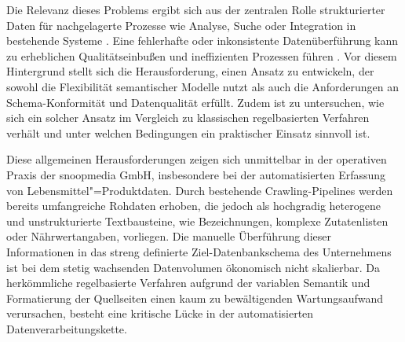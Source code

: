 Die Relevanz dieses Problems ergibt sich aus der zentralen Rolle strukturierter Daten für nachgelagerte Prozesse wie Analyse, Suche oder Integration in bestehende Systeme
 \parencite[vgl.][S. 3]{doan2012principles}. Eine fehlerhafte oder inkonsistente Datenüberführung kann zu erheblichen Qualitätseinbußen und ineffizienten Prozessen führen 
 \parencite[vgl.][S. 5--33]{wang1996beyond}. Vor diesem Hintergrund stellt sich die Herausforderung, einen Ansatz zu entwickeln, der sowohl die Flexibilität semantischer 
 Modelle nutzt als auch die Anforderungen an
 Schema-Konformität und Datenqualität erfüllt. Zudem ist zu untersuchen, wie sich ein solcher Ansatz im Vergleich zu klassischen regelbasierten Verfahren verhält und unter 
 welchen Bedingungen ein praktischer Einsatz sinnvoll ist.

Diese allgemeinen Herausforderungen zeigen sich unmittelbar in der operativen Praxis der snoopmedia GmbH, insbesondere bei der automatisierten Erfassung von 
Lebensmittel"=Produktdaten. Durch bestehende Crawling-Pipelines werden bereits umfangreiche Rohdaten erhoben, die jedoch als hochgradig heterogene und unstrukturierte 
Textbausteine, wie Bezeichnungen, komplexe Zutatenlisten oder Nährwertangaben, vorliegen. Die manuelle Überführung dieser Informationen in das streng definierte 
Ziel-Datenbankschema des Unternehmens ist bei dem stetig wachsenden Datenvolumen ökonomisch nicht skalierbar. Da herkömmliche regelbasierte Verfahren aufgrund der 
variablen Semantik und Formatierung der Quellseiten einen kaum zu bewältigenden Wartungsaufwand verursachen, besteht eine kritische Lücke in der automatisierten 
Datenverarbeitungskette.